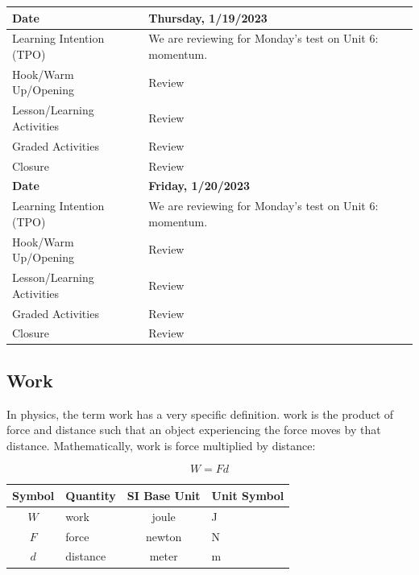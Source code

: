 \documentclass{article}
\numberwithin{equation}{section}
\numberwithin{figure}{section}
\begin{document}
\begin{tabular}{|m{}|m{}|}
    \cellcolor{black!20}\textbf{Date} & \cellcolor{black!20}\textbf{Thursday, 1/19/2023} \\
    \hline
    Learning Intention (TPO) & We are reviewing for Monday's test on Unit 6: momentum.\\
    \hline
    Hook/Warm Up/Opening & Review\\
    \hline
    Lesson/Learning Activities & Review\\
    \hline
    Graded Activities & Review\\
    \hline
    Closure & Review\\
    \hline
    \hline

    \cellcolor{black!20}\textbf{Date} & \cellcolor{black!20}\textbf{Friday, 1/20/2023} \\
    \hline
    Learning Intention (TPO) & We are reviewing for Monday's test on Unit 6: momentum.\\
    \hline
    Hook/Warm Up/Opening & Review\\
    \hline
    Lesson/Learning Activities & Review\\
    \hline
    Graded Activities & Review\\
    \hline
    Closure & Review\\
    \hline
    \hline
\end{tabular}

\clearpage

\subsection{Work} \label{obMgG8}

In physics, the term work has a very specific definition. \Gls{work} is the product of force and distance such that an object experiencing the force moves by that distance. Mathematically, work is force multiplied by distance:

\begin{equation} \label{y0Z6Cw}
    W = F d
\end{equation}

\begin{center}
    \begin{tabular}{cl|cl}
    \hline
    \textbf{Symbol} & \textbf{Quantity} & \textbf{SI Base Unit} & \textbf{Unit Symbol}  \\
    \hline\hline
    \rule{0pt}{2.5ex}
        $W$ & work & joule & J\\
        $F$ & force & newton & N\\
        $d$ & distance & meter & m\\
    \hline
    \end{tabular}
\end{center}
\end{document}
